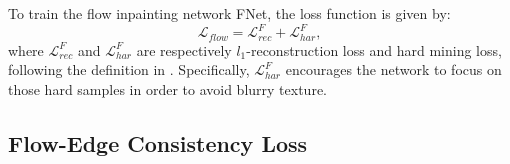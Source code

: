 To train the flow inpainting network FNet, the loss function is given by:
\begin{equation}
	\label{eq:flow_all}
	\mathcal{L}_{flow}=\mathcal{L}^F_{rec}+ \mathcal{L}^F_{har},
\end{equation}
where $\mathcal{L}^F_{rec}$ and $\mathcal{L}^F_{har}$ are respectively $l_1$-reconstruction loss and hard mining loss, following the definition in \cite{Xu_2019_CVPR}. 
Specifically, $\mathcal{L}^F_{har}$ encourages the network to focus on those hard samples in order to avoid blurry texture.

%

\subsection{Flow-Edge Consistency Loss}

